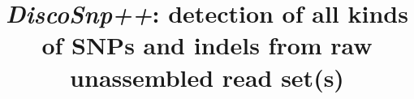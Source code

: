 \documentclass{bmcart}
\begin{document}
\begin{frontmatter}

\begin{fmbox}


\title{{\it DiscoSnp++}: detection of all kinds of SNPs and indels from raw unassembled read set(s)}


\author[
   addressref={aff1},                   %
   corref={aff1},                       %
   email={pierre.peterlongo@inria.fr}   %
]{ }
 \author[
    addressref={aff1},
    email={erwan.drezen@inria.fr}
 ]{ }
 \author[
    addressref={aff1},
    email={claire.lemaitre@inria.fr}
 ]{ }
 \author[
    addressref={aff1},
    email={chloe.riou@inria.fr}
 ]{ }


\address[id=aff1]{%
  , %
  ,                     %
  ,                              %
}


\end{fmbox}
\end{frontmatter}
\end{document}
